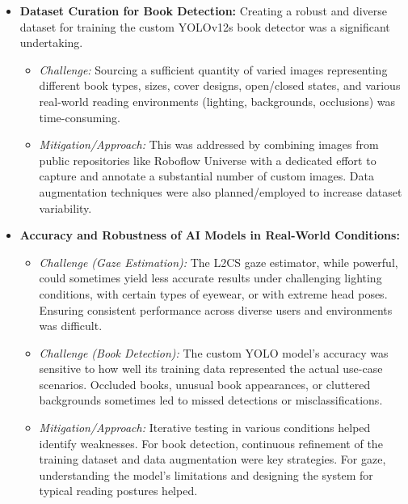 \begin{itemize}
    \item \textbf{Dataset Curation for Book Detection:}
    Creating a robust and diverse dataset for training the custom YOLOv12s book detector was a significant undertaking.
    \begin{itemize}
        \item \textit{Challenge:} Sourcing a sufficient quantity of varied images representing different book types, sizes, cover designs, open/closed states, and various real-world reading environments (lighting, backgrounds, occlusions) was time-consuming.
        \item \textit{Mitigation/Approach:} This was addressed by combining images from public repositories like Roboflow Universe with a dedicated effort to capture and annotate a substantial number of custom images. Data augmentation techniques were also planned/employed to increase dataset variability.
    \end{itemize}

    \item \textbf{Accuracy and Robustness of AI Models in Real-World Conditions:}
    \begin{itemize}
        \item \textit{Challenge (Gaze Estimation):} The L2CS gaze estimator, while powerful, could sometimes yield less accurate results under challenging lighting conditions, with certain types of eyewear, or with extreme head poses. Ensuring consistent performance across diverse users and environments was difficult.
        \item \textit{Challenge (Book Detection):} The custom YOLO model's accuracy was sensitive to how well its training data represented the actual use-case scenarios. Occluded books, unusual book appearances, or cluttered backgrounds sometimes led to missed detections or misclassifications.
        \item \textit{Mitigation/Approach:} Iterative testing in various conditions helped identify weaknesses. For book detection, continuous refinement of the training dataset and data augmentation were key strategies. For gaze, understanding the model's limitations and designing the system for typical reading postures helped.
    \end{itemize}


\end{itemize}
